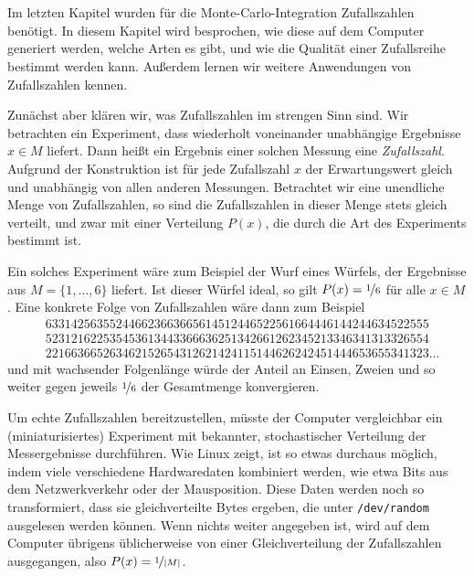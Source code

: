 % 

\chapter{}

Im letzten Kapitel wurden für die Monte-Carlo-Integration
Zufallszahlen benötigt. In diesem Kapitel wird besprochen, wie diese
auf dem Computer generiert werden, welche Arten es gibt, und wie die
Qualität einer Zufallsreihe bestimmt werden kann. Außerdem lernen wir
weitere Anwendungen von Zufallszahlen kennen.

Zunächst aber klären wir, was Zufallszahlen im strengen Sinn sind. Wir
betrachten ein Experiment, dass wiederholt voneinander unabhängige
Ergebnisse $x \in M$ liefert.  Dann heißt ein Ergebnis einer solchen
Messung eine \emph{Zufallszahl}. Aufgrund der Konstruktion ist für
jede Zufallszahl $x$ der Erwartungswert gleich und unabhängig von
allen anderen Messungen. Betrachtet wir eine unendliche
Menge von Zufallszahlen, so sind die Zufallszahlen in dieser Menge
stets gleich verteilt, und zwar mit einer Verteilung $P(x)$, die durch
die Art des Experiments bestimmt ist.

Ein solches Experiment wäre zum Beispiel der Wurf eines Würfels, der
Ergebnisse aus $M=\{1,\ldots,6\}$ liefert. Ist dieser Würfel ideal, so
gilt $P(x) =\nicefrac{1}{6}$ für alle $x\in M$. Eine konkrete
Folge von Zufallszahlen wäre dann zum Beispiel
\begin{align*}
&633142563552446623663665614512446522561664446144244634522555 \\
&523121622535453613443366636251342661262345213346341313326554 \\
&221663665263462152654312621424115144626242451444653655341323\ldots
\end{align*}
und mit wachsender Folgenlänge würde der Anteil an Einsen, Zweien und
so weiter gegen jeweils $\nicefrac{1}{6}$ der Gesamtmenge
konvergieren.

Um echte Zufallszahlen bereitzustellen, müsste der Computer
vergleichbar ein (miniaturisiertes) Experiment mit bekannter,
stochastischer Verteilung der Messergebnisse durchführen. Wie Linux
zeigt, ist so etwas durchaus möglich, indem viele verschiedene
Hardwaredaten kombiniert werden, wie etwa Bits aus dem Netzwerkverkehr
oder der Mausposition. Diese Daten werden noch so transformiert, dass
sie gleichverteilte Bytes ergeben, die unter \texttt{/dev/random}
ausgelesen werden können. Wenn nichts weiter angegeben ist, wird auf
dem Computer übrigens üblicherweise von einer Gleichverteilung der
Zufallszahlen ausgegangen, also $P(x) = \nicefrac{1}{\left\lvert{M}\right\rvert}$.

